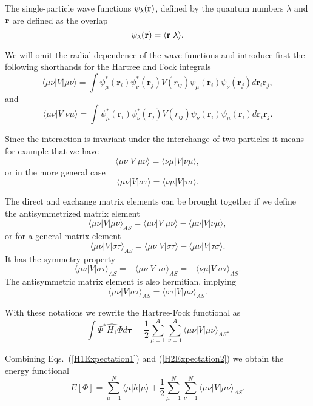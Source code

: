 The single-particle wave functions $\psi_{\lambda}({\bf r})$, defined by the quantum numbers $\lambda$ and ${\bf r}$
are defined as the overlap 
\[
   \psi_{\lambda}({\bf r})  = \langle {\bf r} | \lambda \rangle .
\]

We will omit the radial dependence of the wave functions and 
introduce first the following shorthands for the Hartree and Fock integrals
\[
\langle \mu\nu|V|\mu\nu\rangle =  \int \psi_{\mu}^*(\mathbf{r}_i)\psi_{\nu}^*(\mathbf{r}_j)V(r_{ij})\psi_{\mu}(\mathbf{r}_i)\psi_{\nu}(\mathbf{r}_j)
    d\mathbf{r}_i\mathbf{r}_j,
\]
and 
\[
\langle \mu\nu|V|\nu\mu\rangle = \int \psi_{\mu}^*(\mathbf{r}_i)\psi_{\nu}^*(\mathbf{r}_j)
  V(r_{ij})\psi_{\nu}(\mathbf{r}_i)\psi_{\mu}(\mathbf{r}_i)
  d\mathbf{r}_i\mathbf{r}_j.  
\]

Since the interaction is invariant under the interchange of two particles it means for example that we have
\[
\langle \mu\nu|V|\mu\nu\rangle =  \langle \nu\mu|V|\nu\mu\rangle,  
\]
or in the more general case
\[
\langle \mu\nu|V|\sigma\tau\rangle =  \langle \nu\mu|V|\tau\sigma\rangle.  
\]

The direct and exchange matrix elements can be  brought together if we define the antisymmetrized matrix element
\[
\langle \mu\nu|V|\mu\nu\rangle_{AS}= \langle \mu\nu|V|\mu\nu\rangle-\langle \mu\nu|V|\nu\mu\rangle,
\]
or for a general matrix element  
\[
\langle \mu\nu|V|\sigma\tau\rangle_{AS}= \langle \mu\nu|V|\sigma\tau\rangle-\langle \mu\nu|V|\tau\sigma\rangle.
\]
It has the symmetry property
\[
\langle \mu\nu|V|\sigma\tau\rangle_{AS}= -\langle \mu\nu|V|\tau\sigma\rangle_{AS}=-\langle \nu\mu|V|\sigma\tau\rangle_{AS}.
\]
The antisymmetric matrix element is also hermitian, implying 
\[
\langle \mu\nu|V|\sigma\tau\rangle_{AS}= \langle \sigma\tau|V|\mu\nu\rangle_{AS}.
\]

With these notations we rewrite the Hartree-Fock functional as
\begin{equation}
  \int \Phi^*\hat{H_1}\Phi d\mathbf{\tau} 
  = \frac{1}{2}\sum_{\mu=1}^A\sum_{\nu=1}^A \langle \mu\nu|V|\mu\nu\rangle_{AS}.
\label{H2Expectation2}
\end{equation}


Combining Eqs.~(\ref{H1Expectation1}) and
(\ref{H2Expectation2}) we obtain the energy functional 
\begin{equation}
  E[\Phi] 
  = \sum_{\mu=1}^N \langle \mu | h | \mu \rangle +
  \frac{1}{2}\sum_{{\mu}=1}^N\sum_{{\nu}=1}^N \langle \mu\nu|V|\mu\nu\rangle_{AS}.
\label{FunctionalEPhi}
\end{equation}

